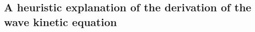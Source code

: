 





\subsection{A heuristic explanation of the derivation of the wave kinetic equation}\label{sec.heuristic}


